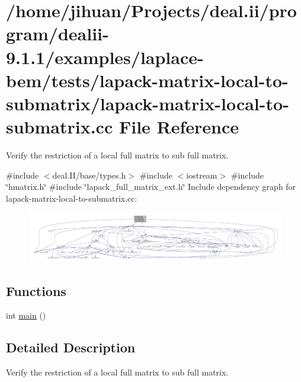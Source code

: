 \hypertarget{lapack-matrix-local-to-submatrix_8cc}{}\section{/home/jihuan/\+Projects/deal.ii/program/dealii-\/9.1.1/examples/laplace-\/bem/tests/lapack-\/matrix-\/local-\/to-\/submatrix/lapack-\/matrix-\/local-\/to-\/submatrix.cc File Reference}
\label{lapack-matrix-local-to-submatrix_8cc}


Verify the restriction of a local full matrix to sub full matrix.  


{\ttfamily \#include $<$deal.\+I\+I/base/types.\+h$>$}\newline
{\ttfamily \#include $<$iostream$>$}\newline
{\ttfamily \#include \char`\"{}hmatrix.\+h\char`\"{}}\newline
{\ttfamily \#include \char`\"{}lapack\+\_\+full\+\_\+matrix\+\_\+ext.\+h\char`\"{}}\newline
Include dependency graph for lapack-\/matrix-\/local-\/to-\/submatrix.cc\+:\nopagebreak
\begin{figure}[H]
\begin{center}
\leavevmode
\includegraphics[width=350pt]{lapack-matrix-local-to-submatrix_8cc__incl}
\end{center}
\end{figure}
\subsection*{Functions}
\begin{DoxyCompactItemize}
\item 
int \hyperlink{lapack-matrix-local-to-submatrix_8cc_ae66f6b31b5ad750f1fe042a706a4e3d4}{main} ()
\end{DoxyCompactItemize}


\subsection{Detailed Description}
Verify the restriction of a local full matrix to sub full matrix. 

